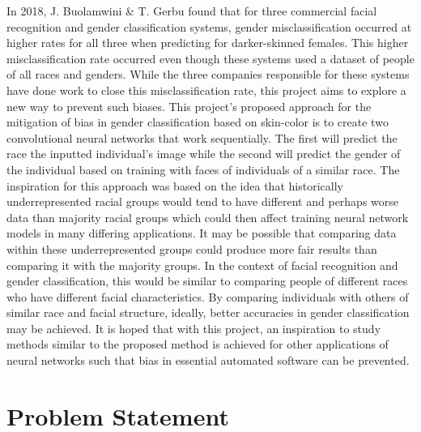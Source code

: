 \documentclass[10pt,twocolumn,letterpaper]{article}
\begin{document}
In 2018, J. Buolamwini \& T. Gerbu \cite{Authors14} found that for three commercial facial recognition and gender classification systems, gender misclassification occurred at higher rates for all three when predicting for darker-skinned females. This higher misclassification rate occurred even though these systems used a dataset of people of all races and genders. While the three companies responsible for these systems have done work to close this misclassification rate, this project aims to explore a new way to prevent such biases. This project's proposed approach for the mitigation of bias in gender classification based on skin-color is to create two convolutional neural networks that work sequentially. The first will predict the race the inputted individual’s image while the second will predict the gender of the individual based on training with faces of individuals of a similar race. The inspiration for this approach was based on the idea that historically underrepresented racial groups would tend to have different and perhaps worse data than majority racial groups which could then affect training neural network models in many differing applications. It may be possible that comparing data within these underrepresented groups could produce more fair results than comparing it with the majority groups. In the context of facial recognition and gender classification, this would be similar to comparing people of different races who have different facial characteristics. By comparing individuals with others of similar race and facial structure, ideally, better accuracies in gender classification may be achieved. It is hoped that with this project, an inspiration to study methods similar to the proposed method is achieved for other applications of neural networks such that bias in essential automated software can be prevented.  

\section{Problem Statement}
\end{document}
